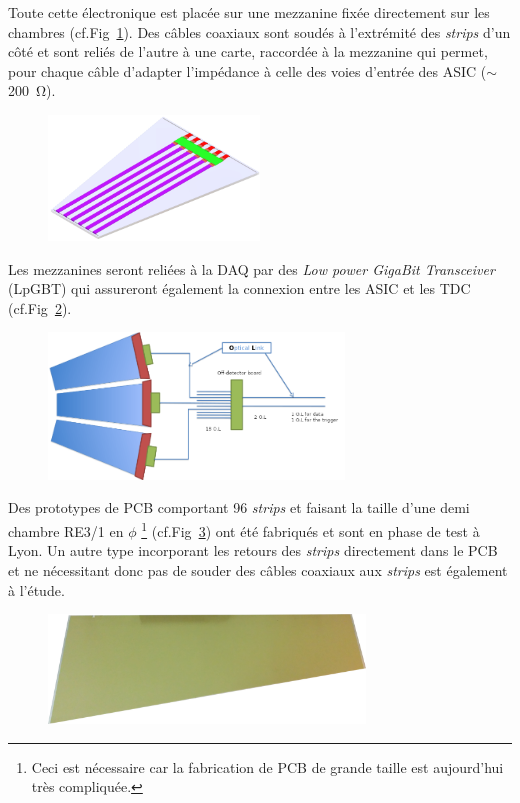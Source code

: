 Toute cette électronique est placée sur une mezzanine fixée directement sur les chambres (cf.Fig~\ref{chamber}). Des câbles coaxiaux sont soudés à l'extrémité des \textit{strips} d'un côté et sont reliés de l'autre à une carte, raccordée à la mezzanine qui permet, pour chaque câble d'adapter l'impédance à celle des voies d'entrée des ASIC ($\sim$\SI{200}{\ohm}).  

\begin{figure}[ht!]
	\centering
	\includegraphics[width=0.50\textwidth]{CON/chambre.png}
	\label{chamber}
\end{figure}

Les mezzanines seront reliées à la DAQ par des \textit{Low power GigaBit Transceiver} (LpGBT) qui assureront également la connexion entre les ASIC et les TDC (cf.Fig~\ref{chambres}). 

\begin{figure}[ht!]
	\centering
	\includegraphics[width=0.70\textwidth]{CON/chambres.png}
	\label{chambres}
\end{figure}

Des prototypes de PCB comportant \num{96} \textit{strips} et faisant la taille d'une demi chambre RE3/1 en $\phi$ \footnote{Ceci est nécessaire car la fabrication de PCB de grande taille est aujourd'hui très compliquée.} (cf.Fig~\ref{proto}) ont été fabriqués et sont en phase de test à Lyon. Un autre type incorporant les retours des \textit{strips} directement dans le PCB et ne nécessitant donc pas de souder des câbles coaxiaux aux \textit{strips} est également à l'étude.

\begin{figure}[ht!]
	\centering
	\includegraphics[width=0.75\textwidth]{CON/proto.png}
	\label{proto}
\end{figure}